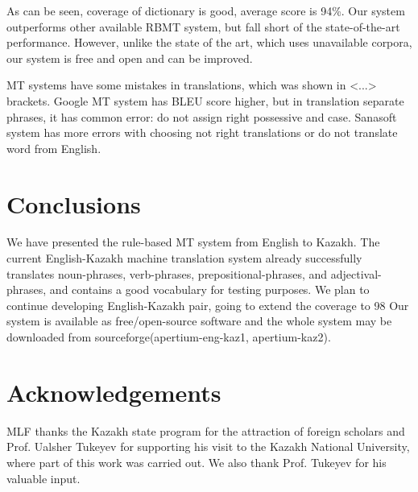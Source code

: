 \documentclass[11pt]{article}
\begin{document}
As can be seen,  coverage of dictionary is good, average score is 94\%. Our system outperforms other available RBMT system, but fall short of the state-of-the-art performance. However, unlike the state of the art, which uses unavailable corpora, our system is free and open and can be improved.

MT systems have some mistakes in translations, which was shown in <...> brackets. Google MT system has BLEU score higher, but in translation separate phrases, it has common error: do not assign right possessive and case. Sanasoft system has more errors with choosing not right translations or do not translate word from English. 

\section{Conclusions}

We have presented the rule-based MT system from English to Kazakh. The current English-Kazakh machine translation system already successfully translates noun-phrases, verb-phrases, prepositional-phrases, and adjectival-phrases, and contains a good vocabulary for testing purposes. 
We plan to continue developing English-Kazakh pair, going to extend the coverage to 98%
Our system is available as free/open-source software and the whole system may be downloaded from sourceforge(apertium-eng-kaz1, apertium-kaz2).

\section*{Acknowledgements}

MLF thanks the Kazakh state program for the attraction of foreign scholars and Prof. Ualsher Tukeyev for supporting his visit to the Kazakh National University, where part of this work was carried out. We also thank Prof. Tukeyev for his valuable input.





\end{document}
